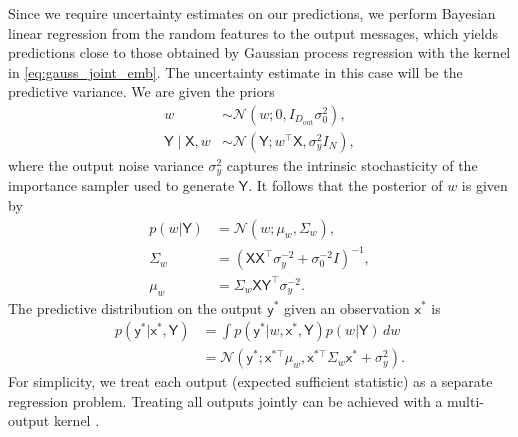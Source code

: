 \documentclass[english]{article}
\theoremstyle{plain}
\theoremstyle{plain}
\begin{document}
Since we require uncertainty estimates on our predictions,
we perform Bayesian linear regression from the random features to the output messages,
which yields predictions close to those obtained by Gaussian process regression
with the kernel in \eqref{eq:gauss_joint_emb}.
The uncertainty estimate in this case will be the predictive 
variance.
We are given the priors
\begin{align}
w & \sim\mathcal{N}\left(w;0,I_{D_\mathrm{out}}\sigma_{0}^{2}\right), \\
\mathsf{Y} \mid \mathsf{X},w & \sim\mathcal{N}\left(\mathsf{Y};w^{\top} \mathsf{X},\sigma_{y}^{2}I_{N}\right),
\end{align}
%
where the output noise variance $\sigma_{y}^{2}$ captures the intrinsic
stochasticity of the importance sampler used to generate $\mathsf{Y}$. It
follows that the posterior of $w$ is given by \citet{Bishop2006}
%
\begin{align}
p(w | \mathsf{Y}) & =\mathcal{N}(w;\mu_{w},\Sigma_{w}), \\
\Sigma_{w} & = \left( \mathsf{X} \mathsf{X}^{\top}\sigma_{y}^{-2}+\sigma_{0}^{-2}I \right)^{-1}, \\
\mu_{w} & =\Sigma_{w} \mathsf{X} \mathsf{Y}^{\top}\sigma_{y}^{-2}.
\end{align}
The predictive distribution on the output $\mathsf{y}^{*}$ given an 
observation $\mathsf{x}^{*}$ is
%
\begin{align}
p(\mathsf{y}^{*}| \mathsf{x}^{*}, \mathsf{Y}) & =\int  
 p(\mathsf{y}^{*}|w, \mathsf{x}^{*}, \mathsf{Y}) p(w|\mathsf{Y}) \, dw\\
 & =\mathcal{N}\left(\mathsf{y}^{*}; \mathsf{x}^{*\top}\mu_{w}, \mathsf{x}^{*\top}\Sigma_{w} \mathsf{x}^{*}+\sigma_{y}^{2}\right).
\end{align}
%
For simplicity, we treat each output (expected sufficient statistic) as a separate regression problem. 
Treating all outputs jointly can be achieved with a multi-output kernel \citep{Alvarez2011}.
 
\end{document}
